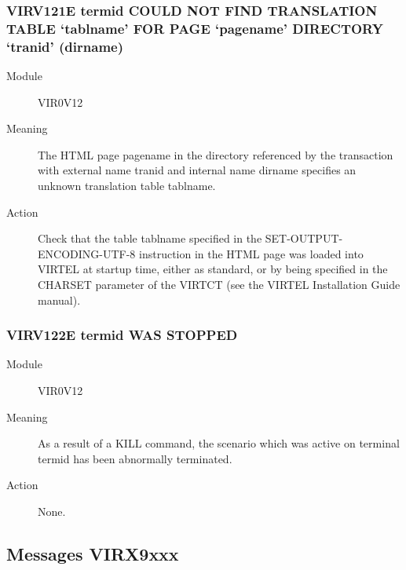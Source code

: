 \documentclass[letterpaper,10pt,english]{sphinxmanual}
\begin{document}
\subsubsection{VIRV121E termid COULD NOT FIND TRANSLATION TABLE ‘tablname’ FOR PAGE ‘pagename’ DIRECTORY ‘tranid’ (dirname)}
\label{\detokenize{messages:virv121e-termid-could-not-find-translation-table-tablname-for-page-pagename-directory-tranid-dirname}}\begin{description}
\item[{Module}] \leavevmode
VIR0V12

\item[{Meaning}] \leavevmode
The HTML page pagename in the directory referenced by the transaction with external name tranid and internal name dirname specifies an unknown translation table tablname.

\item[{Action}] \leavevmode
Check that the table tablname specified in the SET-OUTPUT-ENCODING-UTF-8 instruction in the HTML page was loaded into VIRTEL at startup time, either as standard, or by being specified in the CHARSET parameter of the VIRTCT (see the VIRTEL Installation Guide manual).

\end{description}


\subsubsection{VIRV122E termid WAS STOPPED}
\label{\detokenize{messages:virv122e-termid-was-stopped}}\begin{description}
\item[{Module}] \leavevmode
VIR0V12

\item[{Meaning}] \leavevmode
As a result of a KILL command, the scenario which was active on terminal termid has been abnormally terminated.

\item[{Action}] \leavevmode
None.

\end{description}


\subsection{Messages VIRX9xxx}
\label{\detokenize{messages:messages-virx9xxx}}
\end{document}
